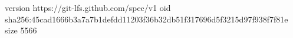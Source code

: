 version https://git-lfs.github.com/spec/v1
oid sha256:45cad1666b3a7a7b1defdd11203f36b32db51f317696d5f3215d97f938f7f81e
size 5566
